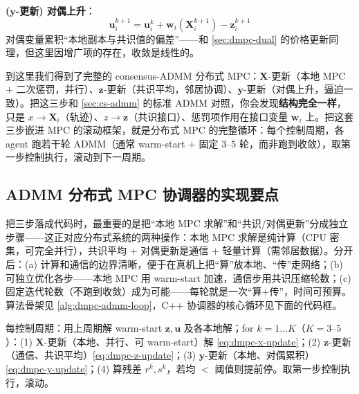 \textbf{($\mathbf{y}$-更新) 对偶上升}：
\begin{equation}
  \boxed{\ \mathbf{u}_i^{k+1}=\mathbf{u}_i^k+\mathbf{w}_i(\mathbf{X}_i^{k+1})-\mathbf{z}_i^{k+1}\ }
  \label{eq:dmpc-y-update}
\end{equation}
对偶变量累积“本地副本与共识值的偏差”——和 \cref{sec:dmpc-dual} 的价格更新同理，但这里因增广项的存在，收敛是线性的。

\begin{insight}\label{ins:dmpc-same-skeleton}
到这里我们得到了完整的 consensus-ADMM 分布式 MPC：$\mathbf{X}$-更新（本地 MPC $+$ 二次惩罚，并行）、$\mathbf{z}$-更新（共识平均，邻居协调）、$\mathbf{y}$-更新（对偶上升，逼迫一致）。把这三步和 \cref{sec:cs-admm} 的标准 ADMM 对照，你会发现\textbf{结构完全一样}，只是 $x\to\mathbf{X}_i$（轨迹）、$z\to\mathbf{z}$（共识接口）、惩罚项作用在接口变量 $\mathbf{w}_i$ 上。把这套三步嵌进 MPC 的滚动框架，就是分布式 MPC 的完整循环：每个控制周期，各 agent 跑若干轮 ADMM（通常 warm-start $+$ 固定 $3$–$5$ 轮，而非跑到收敛），取第一步控制执行，滚动到下一周期。
\end{insight}

\subsection{ADMM 分布式 MPC 协调器的实现要点}
\label{sec:dmpc-admm-impl}

把三步落成代码时，最重要的是把“本地 MPC 求解”和“共识/对偶更新”分成独立步骤——这正对应分布式系统的两种操作：本地 MPC 求解是纯计算（CPU 密集，可完全并行），共识平均 $+$ 对偶更新是通信 $+$ 轻量计算（需邻居数据）。分开后：(a) 计算和通信的边界清晰，便于在真机上把“算”放本地、“传”走网络；(b) 可独立优化各步——本地 MPC 用 warm-start 加速，通信步用共识压缩轮数；(c) 固定迭代轮数（不跑到收敛）成为可能——每轮就是一次“算$+$传”，时间可预算。算法骨架见 \cref{alg:dmpc-admm-loop}，C++ 协调器的核心循环见下面的代码框。

\begin{algo}\label{alg:dmpc-admm-loop}
每控制周期：用上周期解 warm-start $\mathbf{z},\mathbf{u}$ 及各本地解；for $k=1\ldots K$（$K=3$–$5$）：\;(1) $\mathbf{X}$-更新（本地、并行、可 warm-start）解 \cref{eq:dmpc-x-update}；(2) $\mathbf{z}$-更新（通信、共识平均）\cref{eq:dmpc-z-update}；(3) $\mathbf{y}$-更新（本地、对偶累积）\cref{eq:dmpc-y-update}；(4) 算残差 $r^k,s^k$，若均 $<$ 阈值则提前停。取第一步控制执行，滚动。
\end{algo}

